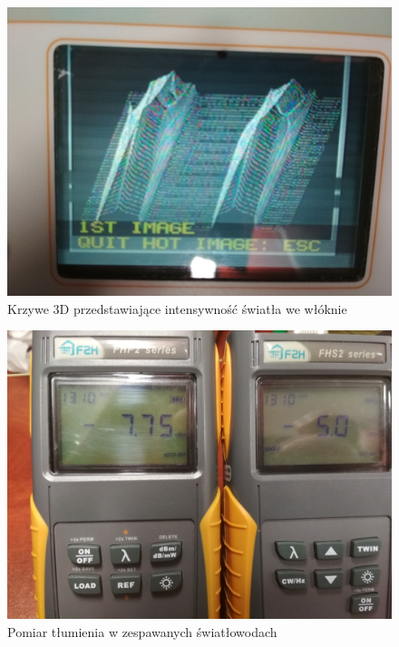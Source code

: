 \documentclass[12pt, a4paper, oneside]{article}
\begin{document}
\begin{figure}[b]
\centering
\caption{Krzywe 3D przedstawiające intensywność światła we włóknie}
\includegraphics[scale=0.075]{f5.jpg}
\end{figure}
\begin{figure}[t]
\centering
\caption{Pomiar tłumienia w zespawanych światłowodach}
\includegraphics[scale=0.075]{f6.jpg}
\end{figure}
\clearpage
\end{document}
